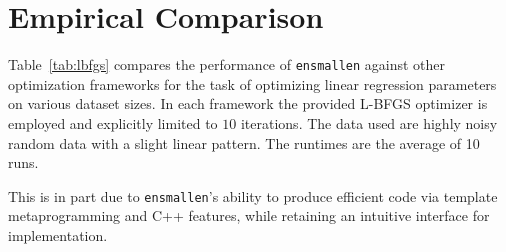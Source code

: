 \documentclass[twoside,11pt]{article}
\begin{document}


\section{Empirical Comparison}

Table~\ref{tab:lbfgs} compares the performance
of {\tt ensmallen} against other optimization frameworks
for the task of optimizing linear regression parameters on various dataset sizes.
In each framework the provided L-BFGS optimizer is employed
and explicitly limited to $10$ iterations.
The data used are highly noisy random data with a slight linear pattern.
The runtimes are the average of 10 runs.




This is in part due to {\tt ensmallen}'s ability to produce efficient code via
template metaprogramming and C++ features, while retaining an intuitive
interface for implementation.
\end{document}
